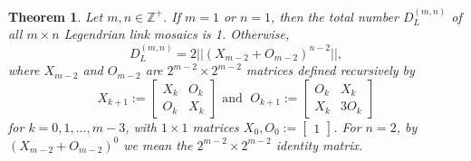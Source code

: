 \documentclass{article}
\newcommand{\Z}{\mathbb{Z}}
\newtheorem{theorem}{Theorem}
\begin{document}
\begin{theorem} \label{thm:counting}
    Let $m,n\in\Z^+$. If $m=1$ or $n=1$, then the total number $D_L^{(m,n)}$ of all $m\times n $ Legendrian link mosaics is 1. Otherwise,
    \[
    D_L^{(m,n)} = 2||(X_{m-2}+O_{m-2})^{n-2}||,
    \]
    where $X_{m-2}$ and $O_{m-2}$ are $2^{m-2}\times 2^{m-2}$ matrices defined recursively by
    \[
    X_{k+1}:=\begin{bmatrix}
        X_k & O_k \\ O_k & X_k
    \end{bmatrix} \text{ and }\; O_{k+1}:=\begin{bmatrix}
        O_k & X_k \\ X_k & 3O_k
    \end{bmatrix}
    \]
    for $k=0,1,\dots,m-3$, with $1\times 1$ matrices $X_0,O_0:=\begin{bmatrix}
        1
    \end{bmatrix}$.
    For $n=2$, by $(X_{m-2}+O_{m-2})^{0}$ we mean the $2^{m-2}\times 2^{m-2}$ identity matrix. 
\end{theorem}
\end{document}

